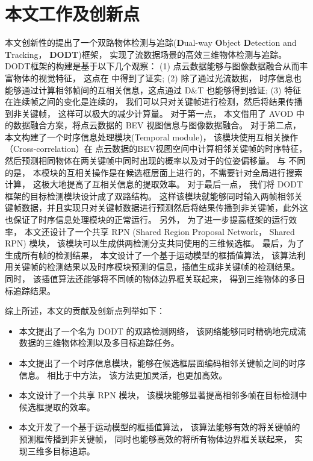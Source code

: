 \section{本文工作及创新点}
\label{subsec:contribution}
本文创新性的提出了一个双路物体检测与追踪(\textbf{D}ual-way \textbf{O}bject \textbf{D}etection and \textbf{T}racking， \textbf{DODT})框架， 实现了流数据场景的高效三维物体检测与追踪。 DODT框架的构建是基于以下几个观察： (1) 点云数据能够与图像数据融合从而丰富物体的视觉特征， 这点在 \cite{chen2017multi,ku2018joint}中得到了证实; (2) 除了通过光流数据， 时序信息也能够通过计算相邻帧间的互相关信息，这点通过 D\&T\cite{feichtenhofer2017detect} 也能够得到验证; (3) 特征在连续帧之间的变化是连续的， 我们可以只对关键帧进行检测，然后将结果传播到非关键帧， 这样可以极大的减少计算量。 对于第一点， 本文借用了 AVOD\cite{ku2018joint} 中的数据融合方案，将点云数据的 BEV 视图信息与图像数据融合。 对于第二点， 本文构建了一个时序信息处理模块(Temporal module)， 该模块使用互相关操作（Cross-correlation）在 点云数据的BEV视图空间中计算相邻关键帧的时序特征， 然后预测相同物体在两关键帧中同时出现的概率以及对于的位姿偏移量。 与 \cite{feichtenhofer2017detect,dosovitskiy2015flownet} 不同的是， 本模块的互相关操作是在候选框层面上进行的，不需要针对全局进行搜索计算， 这极大地提高了互相关信息的提取效率。 对于最后一点， 我们将 DODT 框架的目标检测模块设计成了双路结构。 这样该模块就能够同时输入两帧相邻关键帧数据，并且实现只对关键帧数据进行预测然后将结果传播到非关键帧，此外这也保证了时序信息处理模块的正常运行。 另外， 为了进一步提高框架的运行效率， 本文还设计了一个共享 RPN (Shared Region Proposal Network， Shared RPN) 模块， 该模块可以生成供两检测分支共同使用的三维候选框。 最后，为了生成所有帧的检测结果， 本文设计了一个基于运动模型的框插值算法， 该算法利用关键帧的检测结果以及时序模块预测的信息，插值生成非关键帧的检测结果。 同时， 该插值算法还能够将不同帧的物体边界框关联起来， 得到三维物体的多目标追踪结果。

综上所述，本文的贡献及创新点列举如下：
\begin{itemize}
	\item 本文提出了一个名为 DODT 的双路检测网络， 该网络能够同时精确地完成流数据的三维物体检测以及多目标追踪任务。
	\item 本文提出了一个时序信息模块，能够在候选框层面编码相邻关键帧之间的时序信息。 相比于\cite{feichtenhofer2017detect,dosovitskiy2015flownet}中方法， 该方法更加灵活，也更加高效。
	\item 本文设计了一个共享 RPN 模块， 该模块能够显著提高相邻多帧在目标检测中候选框提取的效率。
	\item 本文开发了一个基于运动模型的框插值算法， 该算法能够有效的将关键帧的预测框传播到非关键帧， 同时也能够高效的将所有物体边界框关联起来， 实现三维多目标追踪。
\end{itemize}


